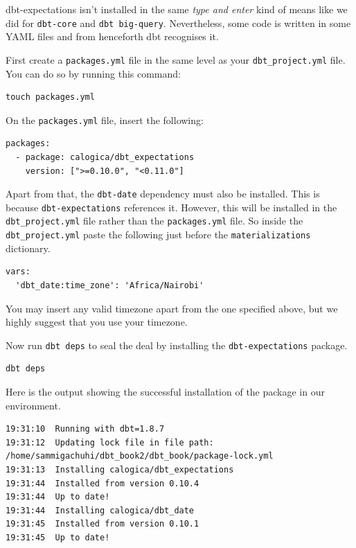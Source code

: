 \documentclass[
]{book}
\begin{document}
dbt-expectations isn't installed in the same \emph{type and enter} kind of means like we did for \texttt{dbt-core} and \texttt{dbt\ big-query}. Nevertheless, some code is written in some YAML files and from henceforth dbt recognises it.

First create a \texttt{packages.yml} file in the same level as your \texttt{dbt\_project.yml} file. You can do so by running this command:

\begin{verbatim}
touch packages.yml
\end{verbatim}

On the \texttt{packages.yml} file, insert the following:

\begin{verbatim}
packages:
  - package: calogica/dbt_expectations
    version: [">=0.10.0", "<0.11.0"]
\end{verbatim}

Apart from that, the \texttt{dbt-date} dependency must also be installed. This is because \texttt{dbt-expectations} references it. However, this will be installed in the \texttt{dbt\_project.yml} file rather than the \texttt{packages.yml} file. So inside the \texttt{dbt\_project.yml} paste the following just before the \texttt{materializations} dictionary.

\begin{verbatim}
vars:
  'dbt_date:time_zone': 'Africa/Nairobi'
\end{verbatim}

You may insert any valid timezone apart from the one specified above, but we highly suggest that you use your timezone.

Now run \texttt{dbt\ deps} to seal the deal by installing the \texttt{dbt-expectations} package.

\begin{verbatim}
dbt deps
\end{verbatim}

Here is the output showing the successful installation of the package in our environment.

\begin{verbatim}
19:31:10  Running with dbt=1.8.7
19:31:12  Updating lock file in file path: /home/sammigachuhi/dbt_book2/dbt_book/package-lock.yml
19:31:13  Installing calogica/dbt_expectations
19:31:44  Installed from version 0.10.4
19:31:44  Up to date!
19:31:44  Installing calogica/dbt_date
19:31:45  Installed from version 0.10.1
19:31:45  Up to date!
\end{verbatim}
\end{document}
